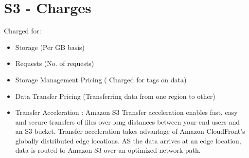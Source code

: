 \documentclass{report}
\begin{document}
\section*{S3 - Charges}
Charged for:
\begin{itemize}
\item
Storage (Per GB basis)

\item
Requests (No. of requests)

\item
Storage Management Pricing ( Charged for tags on data)

\item
Data Transfer Pricing (Transferring data from one region to other)

\item
Transfer Acceleration : Amazon S3 Transfer acceleration enables fast, easy and secure transfers of files over long distances between your end users and an S3 bucket. Transfer acceleration takes advantage of Amazon CloudFront's globally distributed edge locations. AS the data arrives at an edge location, data is routed to Amazon S3 over an optimized network path.
\end{itemize}
\end{document}
